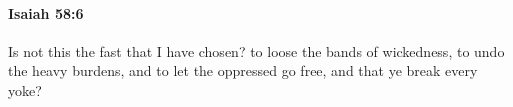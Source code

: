 
		\paragraph{Isaiah 58:6} %
			\label{ISAIAH-58-6}

			Is not this the fast that I have chosen? to loose the bands of wickedness, to undo the heavy burdens, and to let the oppressed go free, and that ye break every yoke?


